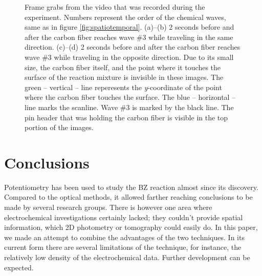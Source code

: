 \documentclass[3p, twocolumn]{elsarticle}
\begin{document}
\begin{figure}
\centering
{}
\caption{Frame grabs from the video that was recorded during the experiment.
Numbers represent the order of the chemical waves, same as in figure \ref{fig:spatiotemporal}.
(a)--(b) 2 seconds before and after the carbon fiber reaches wave \#3 while traveling in the same direction.
(c)--(d) 2 seconds before and after the carbon fiber reaches wave \#3 while traveling in the opposite direction.
Due to its small size, the carbon fiber itself, and the point where it touches the surface of the reaction mixture is invisible in these images.
The green -- vertical -- line reperesents the \emph{y}-coordinate of the point where the carbon fiber touches the surface.
The blue -- horizontal -- line marks the scanline.
Wave \#3 is marked by the black line.
The pin header that was holding the carbon fiber is visible in the top portion of the images.
}
\label{fig:grabs2}
\end{figure}

\section{Conclusions}
Potentiometry has been used to study the BZ reaction almost since its discovery.
Compared to the optical methods, it allowed farther reaching conclusions to be made by several research groups.
There is however one area where electrochemical investigations certainly lacked; they couldn't provide spatial information, which 2D photometry or tomography could easily do.
In this paper, we made an attempt to combine the advantages of the two techniques.
In its current form there are several limitations of the technique, for instance, the relatively low density of the electrochemical data.
Further development can be expected.
\end{document}
